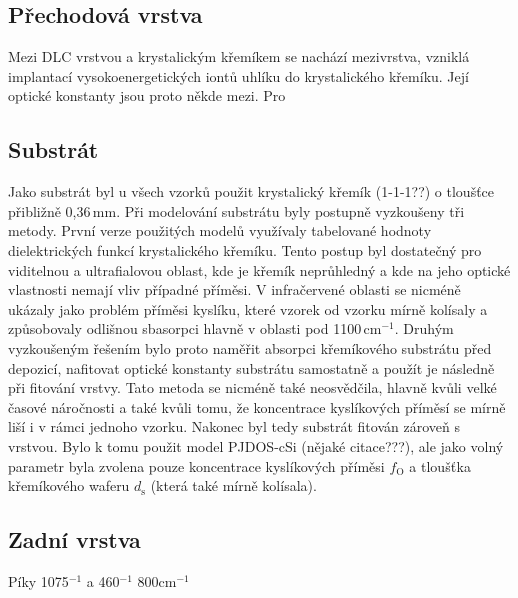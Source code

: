 \subsection{Přechodová vrstva}
Mezi DLC vrstvou a krystalickým křemíkem se nachází mezivrstva, vzniklá implantací vysokoenergetických iontů uhlíku do krystalického křemíku. Její optické konstanty jsou proto někde mezi. Pro  

\subsection{Substrát}
Jako substrát byl u všech vzorků použit krystalický křemík (1-1-1??) o tloušťce přibližně 0,36\,mm. Při modelování substrátu byly postupně vyzkoušeny tři metody. První verze použitých modelů využívaly tabelované hodnoty dielektrických funkcí krystalického křemíku. Tento postup byl dostatečný pro viditelnou a ultrafialovou oblast, kde je křemík neprůhledný a kde na jeho optické vlastnosti nemají vliv případné příměsi. V infračervené oblasti se nicméně ukázaly jako problém příměsi kyslíku, které vzorek od vzorku mírně kolísaly a způsobovaly odlišnou sbasorpci hlavně v oblasti pod 1100\,cm$^{-1}$. Druhým vyzkoušeným řešením bylo proto naměřit absorpci křemíkového substrátu před depozicí, nafitovat optické konstanty substrátu samostatně a použít je následně při fitování vrstvy. Tato metoda se nicméně také neosvědčila, hlavně kvůli velké časové náročnosti a také kvůli tomu, že koncentrace kyslíkových příměsí se mírně liší i v rámci jednoho vzorku.
Nakonec byl tedy substrát fitován zároveň s vrstvou. Bylo k tomu použit model PJDOS-cSi \cite{}(nějaké citace???), ale jako volný parametr byla zvolena pouze koncentrace kyslíkových příměsi $f_\mathrm{O}$ a tloušťka křemíkového waferu $d_\mathrm{s}$ (která také mírně kolísala).  

\subsection{Zadní vrstva}
Píky 1075$^{-1}$ a 460$^{-1}$ 800cm$^{-1}$

\cleardoublepage
